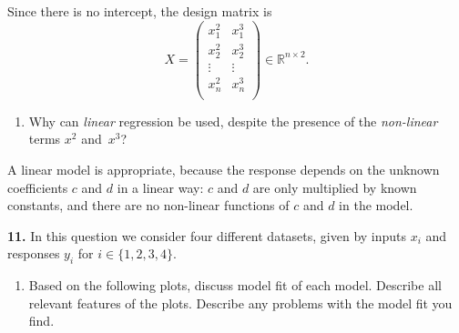 \documentclass[
  a4paper,
]{article}
\providecommand{\tightlist}{%
  \setlength{\itemsep}{0pt}\setlength{\parskip}{0pt}}
\theoremstyle{definition}
\theoremstyle{definition}
\theoremstyle{definition}
\theoremstyle{definition}
\theoremstyle{remark}
\begin{document}
\begin{myanswers}
Since there is no intercept, the design matrix is
\begin{equation*}
  X = \begin{pmatrix}
    x_1^2 & x_1^3 \\
    x_2^2 & x_2^3 \\
    \vdots & \vdots \\
    x_n^2 & x_n^3 \\
  \end{pmatrix}
  \in \mathbb{R}^{n\times 2}.
\end{equation*}

\end{myanswers}

\begin{enumerate}
\def\labelenumi{\alph{enumi}.}
\setcounter{enumi}{2}
\tightlist
\item
  Why can \emph{linear} regression be used, despite the presence
  of the \emph{non-linear} terms \(x^2\) and~\(x^3\)?
\end{enumerate}

\begin{myanswers}
A linear model is appropriate, because the response depends
on the unknown coefficients \(c\) and \(d\) in a linear way: \(c\) and \(d\)
are only multiplied by known constants, and there are no non-linear
functions of \(c\) and \(d\) in the model.

\end{myanswers}

\textbf{11.} In this question we consider four different datasets, given by
inputs \(x_i\) and responses \(y_i\) for \(i \in \{1, 2, 3, 4\}\).

\begin{enumerate}
\def\labelenumi{\alph{enumi}.}
\tightlist
\item
  Based on the following plots, discuss model fit of each model.
  Describe all relevant features of the plots.
  Describe any problems with the model fit you find.
\end{enumerate}
\end{document}
